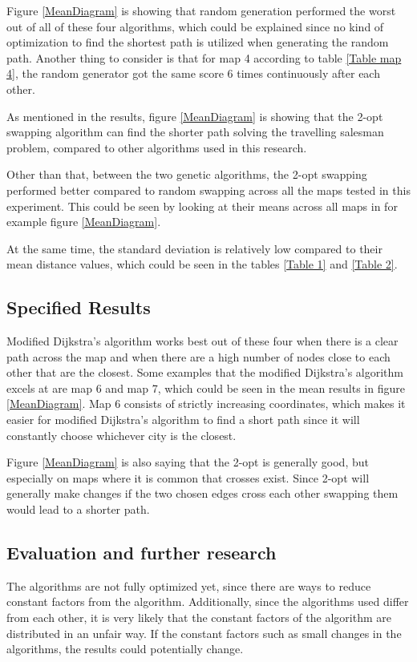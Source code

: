 \documentclass{article}
\begin{document}
\noindent
Figure \ref{MeanDiagram} is showing that random generation performed the worst out of all of these four algorithms, which could be explained since no kind of optimization to find the shortest path is utilized when generating the random path. Another thing to consider is that for map 4 according to table \ref{Table map 4}, the random generator got the same score 6 times continuously after each other.

\noindent
As mentioned in the results, figure \ref{MeanDiagram} is showing that the 2-opt swapping algorithm can find the shorter path solving the travelling salesman problem, compared to other algorithms used in this research.

\noindent
Other than that, between the two genetic algorithms, the 2-opt swapping performed better compared to random swapping across all the maps tested in this experiment. This could be seen by looking at their means across all maps in for example figure \ref{MeanDiagram}. 

\noindent
At the same time, the standard deviation is relatively low compared to their mean distance values, which could be seen in the tables \ref{Table 1} and \ref{Table 2}. 

\subsection{Specified Results}\label{subsec2}
Modified Dijkstra's algorithm works best out of these four when there is a clear path across the map and when there are a high number of nodes close to each other that are the closest. Some examples that the modified Dijkstra's algorithm excels at are map 6 and map 7, which could be seen in the mean results in figure \ref{MeanDiagram}. Map 6 consists of strictly increasing coordinates, which makes it easier for modified Dijkstra's algorithm to find a short path since it will constantly choose whichever city is the closest. 

\noindent
Figure \ref{MeanDiagram} is also saying that the 2-opt is generally good, but especially on maps where it is common that crosses exist. Since 2-opt will generally make changes if the two chosen edges cross each other swapping them would lead to a shorter path.


\subsection{Evaluation and further research}\label{subsec3}
The algorithms are not fully optimized yet, since there are ways to reduce constant factors from the algorithm. Additionally, since the algorithms used differ from each other, it is very likely that the constant factors of the algorithm are distributed in an unfair way. If the constant factors such as small changes in the algorithms, the results could potentially change. 
\end{document}
